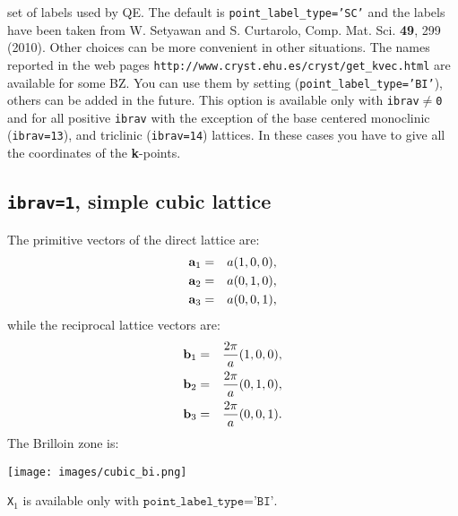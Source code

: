 \documentclass[12pt,a4paper]{article}
\begin{document}
set of labels used by QE. The default is \texttt{point\_label\_type='SC'} and
the labels have been taken from W. Setyawan and S. Curtarolo, Comp. Mat. Sci.
{\bf 49}, 299 (2010). Other choices can be more convenient in other situations. 
The names reported in the web pages 
\texttt{http://www.cryst.ehu.es/cryst/get\_kvec.html}
are available for some BZ. You can use them by setting
(\texttt{point\_label\_type='BI'}), others can be added in the future.
This option is available only with \texttt{ibrav$\ne$0} and for 
all positive \texttt{ibrav} with the exception of the base centered 
monoclinic (\texttt{ibrav=13}), and triclinic (\texttt{ibrav=14}) lattices. 
In these cases you have to give all the coordinates of the {\bf k}-points.

\subsection{\texttt{ibrav=1}, simple cubic lattice}
The primitive vectors of the direct lattice are:
\begin{eqnarray}
{\bf a}_1 &=& a (1, 0, 0), \nonumber \\
{\bf a}_2 &=& a (0, 1, 0), \nonumber \\
{\bf a}_3 &=& a (0, 0, 1), \nonumber
\nonumber
\end{eqnarray}
while the reciprocal lattice vectors are:
\begin{eqnarray}
{\bf b}_1 &=& {2\pi \over a} (1, 0, 0), \nonumber \\
{\bf b}_2 &=& {2\pi \over a} (0, 1, 0), \nonumber \\
{\bf b}_3 &=& {2\pi \over a} (0, 0, 1). \nonumber
\nonumber
\end{eqnarray}
The Brilloin zone is:
\begin{center}
\texttt{[image: images/cubic\_bi.png]}
\end{center}
\texttt{X$_1$} is available only with $\texttt{point\_label\_type='BI'}$.
\end{document}
